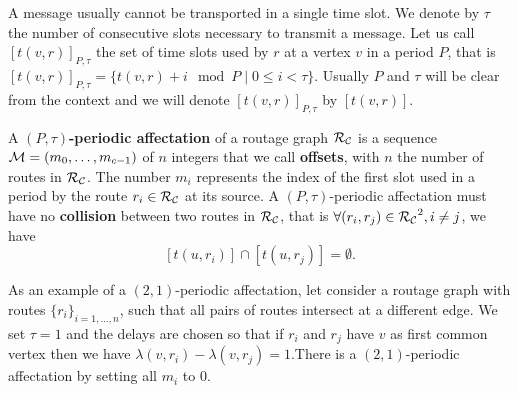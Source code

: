 \documentclass[a4paper,10pt]{article}
\begin{document}
      A message usually cannot be transported in a single time slot. We denote by $\tau$ the number 
      of consecutive slots necessary to transmit a message. Let us call $[t(v,r)]_{P,\tau}$ the set of time slots used by $r$ at a vertex $v$ in a period $P$, that is $[t(v,r)]_{P,\tau} = \{t(v,r) + i \mod P \mid 0 \leq i < \tau \}$. Usually $P$ and $\tau$ will be clear from the context and we will denote $[t(v,r)]_{P,\tau}$ by $[t(v,r)]$.
      
      
      A {\bf $(P,\tau)$-periodic affectation} of a routage graph $\cal R_{\cal C}$ is a sequence  ${\cal M}=(m_0, \ldots ,m_{c-1})$ of $n$ integers that we call {\bf offsets}, with $n$ the number of routes in $\cal R_{\cal C}$. The number $m_i$ represents the index of the first slot used in a period  by the route $r_i \in \cal R_{\cal C}$ at its source.
      A $(P,\tau)$-periodic affectation must have no {\bf collision} between two routes in $\cal R_{\cal C}$, that is $\forall (r_i, r_j) \in {\cal R_{\cal C}}^2, i \neq j$, %
      we have $$[t(u,r_i)] \cap [t(u,r_j)] = \emptyset .$$
      

      As an example of a $(2,1)$-periodic affectation, let consider a routage graph with routes $\{r_i\}_{i=1,\dots,n}$, such that all pairs of routes intersect at a different edge.
      We set $\tau = 1$ and the delays are chosen so that if $r_i$ and $r_j$ have $v$ as first common vertex then we have $\lambda(v,r_i) - \lambda(v,r_j)=1$.There is a $(2,1)$-periodic affectation by setting all $m_i$ to $0$.
\end{document}
